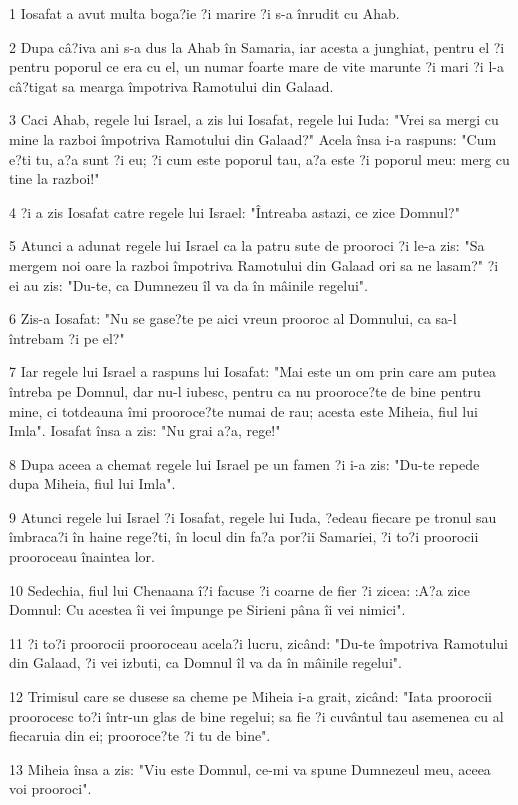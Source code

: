 \par 1 Iosafat a avut multa boga?ie ?i marire ?i s-a înrudit cu Ahab.
\par 2 Dupa câ?iva ani s-a dus la Ahab în Samaria, iar acesta a junghiat, pentru el ?i pentru poporul ce era cu el, un numar foarte mare de vite marunte ?i mari ?i l-a câ?tigat sa mearga împotriva Ramotului din Galaad.
\par 3 Caci Ahab, regele lui Israel, a zis lui Iosafat, regele lui Iuda: "Vrei sa mergi cu mine la razboi împotriva Ramotului din Galaad?" Acela însa i-a raspuns: "Cum e?ti tu, a?a sunt ?i eu; ?i cum este poporul tau, a?a este ?i poporul meu: merg cu tine la razboi!"
\par 4 ?i a zis Iosafat catre regele lui Israel: "Întreaba astazi, ce zice Domnul?"
\par 5 Atunci a adunat regele lui Israel ca la patru sute de prooroci ?i le-a zis: "Sa mergem noi oare la razboi împotriva Ramotului din Galaad ori sa ne lasam?" ?i ei au zis: "Du-te, ca Dumnezeu îl va da în mâinile regelui".
\par 6 Zis-a Iosafat: "Nu se gase?te pe aici vreun prooroc al Domnului, ca sa-l întrebam ?i pe el?"
\par 7 Iar regele lui Israel a raspuns lui Iosafat: "Mai este un om prin care am putea întreba pe Domnul, dar nu-l iubesc, pentru ca nu prooroce?te de bine pentru mine, ci totdeauna îmi prooroce?te numai de rau; acesta este Miheia, fiul lui Imla". Iosafat însa a zis: "Nu grai a?a, rege!"
\par 8 Dupa aceea a chemat regele lui Israel pe un famen ?i i-a zis: "Du-te repede dupa Miheia, fiul lui Imla".
\par 9 Atunci regele lui Israel ?i Iosafat, regele lui Iuda, ?edeau fiecare pe tronul sau îmbraca?i în haine rege?ti, în locul din fa?a por?ii Samariei, ?i to?i proorocii prooroceau înaintea lor.
\par 10 Sedechia, fiul lui Chenaana î?i facuse ?i coarne de fier ?i zicea: :A?a zice Domnul: Cu acestea îi vei împunge pe Sirieni pâna îi vei nimici".
\par 11 ?i to?i proorocii prooroceau acela?i lucru, zicând: "Du-te împotriva Ramotului din Galaad, ?i vei izbuti, ca Domnul îl va da în mâinile regelui".
\par 12 Trimisul care se dusese sa cheme pe Miheia i-a grait, zicând: "Iata proorocii proorocesc to?i într-un glas de bine regelui; sa fie ?i cuvântul tau asemenea cu al fiecaruia din ei; prooroce?te ?i tu de bine".
\par 13 Miheia însa a zis: "Viu este Domnul, ce-mi va spune Dumnezeul meu, aceea voi prooroci".
